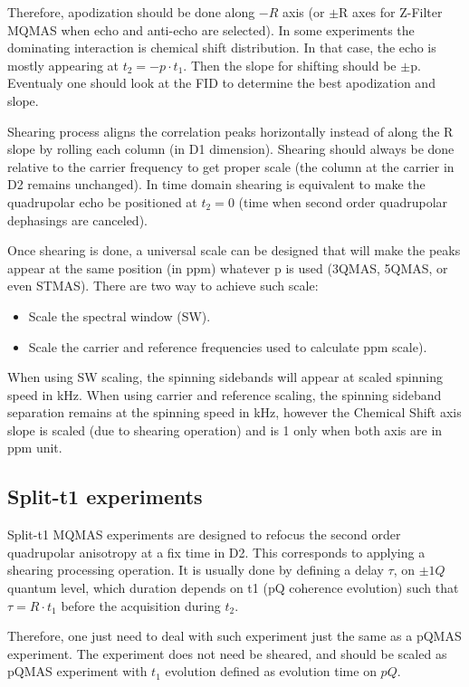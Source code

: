 \documentclass[11pt,a4paper]{article}
\begin{document}
Therefore, apodization should be done along $-R$ axis (or $\pm$R axes for Z-Filter MQMAS when echo and anti-echo are selected).
In some experiments the dominating interaction is chemical shift distribution. In that case, the echo is mostly appearing 
at $t_2 = -p \cdot  t_1$. Then the slope for shifting should be $\pm$p. Eventualy one should look at the FID to determine the best
apodization and slope.


Shearing process aligns the correlation peaks horizontally instead of along the R slope by rolling each column (in D1 dimension). 
Shearing should always be done relative to the carrier frequency to get proper scale (the column at the carrier 
in D2 remains unchanged). In time domain shearing is equivalent to make the quadrupolar echo be positioned
at $t_2=0$ (time when second order quadrupolar dephasings are canceled). 

Once shearing is done, a universal scale can be designed that will make the peaks appear at the same position (in ppm)
whatever p is used (3QMAS, 5QMAS, or even STMAS). There are two way to achieve such scale:
\begin{itemize}
  \item Scale the spectral window (SW).
  \item Scale the carrier and reference frequencies used to calculate ppm scale).
\end{itemize}

When using SW scaling, the spinning sidebands will appear at scaled spinning speed in kHz. When using carrier and 
reference scaling, the spinning sideband separation remains at the spinning speed in kHz, however the Chemical Shift axis 
slope is scaled (due to shearing operation) and is 1 only when both axis are in ppm unit.

\subsection{Split-t1 experiments}
Split-t1 MQMAS experiments are designed to refocus the second order quadrupolar anisotropy at a fix time in D2.
This corresponds to applying a shearing processing operation. It is usually done by defining a delay $\tau$, on $\pm 1Q$ quantum
level, which duration depends on t1 (pQ coherence evolution) such that $\tau = R \cdot t_1$ before the acquisition during $t_2$.

Therefore, one just need to deal with such experiment just the same as a pQMAS experiment. The experiment does not need be sheared, 
and should be scaled as pQMAS experiment with $t_1$ evolution defined as evolution time on $pQ$. 
\end{document}

